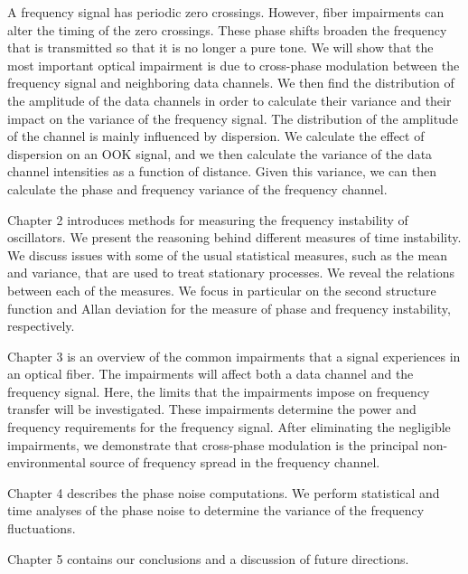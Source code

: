 A frequency signal has periodic zero crossings.  However, fiber impairments can alter the timing of the zero crossings.  These phase shifts broaden the frequency that is transmitted so that it is no longer a pure tone. We will show that the most important optical impairment is due to cross-phase modulation between the frequency signal and neighboring data channels. We then find the distribution of the amplitude of the data channels in order to calculate their variance and their impact on the variance of the frequency signal.  The distribution of the amplitude of the channel is mainly influenced by dispersion.  We calculate the effect of dispersion on an OOK signal, and we then calculate the variance of the data channel intensities as a function of distance. Given this variance, we can then calculate the phase and frequency variance of the frequency channel.


Chapter 2 introduces methods for measuring the frequency instability of oscillators. We present the reasoning behind different measures of time instability. We discuss issues with some of the usual statistical measures, such as the mean and  variance, that are used to treat stationary processes. We reveal the relations between each of the measures. We focus in particular on the second structure function and Allan deviation for the measure of phase and frequency instability, respectively.

Chapter 3 is an overview of the common impairments that a signal experiences in an optical fiber.  The impairments will affect both a data channel and the frequency signal. Here, the limits that the impairments impose on frequency transfer will be investigated. These impairments determine the power and frequency requirements for the frequency signal. After eliminating the negligible impairments, we demonstrate that cross-phase modulation is the principal non-environmental source of frequency spread in the frequency channel.

Chapter 4 describes the phase noise computations.  We perform statistical and time analyses of the phase noise to determine the variance of the frequency fluctuations.

Chapter 5 contains our conclusions and a discussion of future directions.


